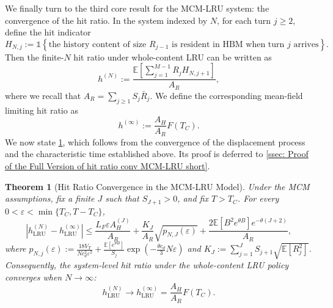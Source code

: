 \documentclass{article}
\newtheorem{theorem}{Theorem}[section]
\theoremstyle{definition}
\newcommand{\E}{\mathbb E}
\newcommand{\LRU}{\mathrm{LRU}}
\newcommand{\one}{\mathds{1}}
\begin{document}
We finally turn to the third core result for the MCM-LRU system: the convergence of the  hit ratio. In the system indexed by $N$, for each turn $j\geq2$, define the hit indicator
\[
    H_{N,j} := \one \left\{ \text{the history content of size $R_{j-1}$ is resident in HBM when turn $j$ arrives} \right\}.
\]
Then the finite-$N$  hit ratio under whole-content LRU can be written as
\begin{equation}
\label{equ: finite N LRU hit ratio}
    h ^{(N)}:=\frac{\E\left[\sum_{j=1}^{M-1}R_jH_{N,j+1}\right]}{A_R},
\end{equation}
where we recall that $A_R=\sum_{j\geq1}S_j\bar R_j.$ We define the corresponding mean-field limiting hit ratio as
\begin{equation}
\label{equ: limiting LRU hit ratio}
    h ^{(\infty)}  :=\frac{A_H}{A_R}  F(T_C). 
\end{equation}
We now state \cref{thm: Hit Ratio Convergence Full}, which follows from the convergence of the displacement process and the characteristic time established above. Its proof is deferred to \cref{ssec: Proof of the Full Version of hit ratio conv MCM-LRU short}.


\begin{theorem}[Hit Ratio Convergence in the MCM-LRU Model]
\label{thm: Hit Ratio Convergence Full}
    Under the MCM assumptions, fix a finite $J$ such that $S_{J+1}>0$, and fix $T>T_C$. For every $0<\varepsilon<\min\{T_C,T-T_C\}$,
    \begin{equation}
    \label{equ: finite N hit ratio error bound}
    \left|h_{\LRU}^{(N)} -h_{\LRU}^{(\infty)}  \right| \leq \frac{L_F\varepsilon A_H^{(J)}}{A_R} +\frac{K_J}{A_R}\sqrt{p_{N,J}(\varepsilon)} +\frac{2\E[B^2e^{\theta B}]e^{-\theta(J+2)}}{A_R},
    \end{equation}
    where $p_{N,j}(\varepsilon):= \frac{18V_T}{Nc_d^2\varepsilon^2}
        +\frac{\E[e^{\theta B}]}{S_j}\exp\left(-\frac{\theta c_d}{3}N\varepsilon\right)$ and  $K_J:=\sum_{j=1}^{J}S_{j+1}\sqrt{\E[R_j^2]}$.
    Consequently, the system-level hit ratio under the whole-content LRU policy converges when $N\rightarrow\infty$:
    \begin{equation}
    \label{equ: hit ratio convergence-2}
        h_{\LRU}^{(N)} \rightarrow h_{\LRU}^{(\infty)}  =\frac{A_H}{A_R} F(T_C).
    \end{equation}
\end{theorem}
\end{document}
